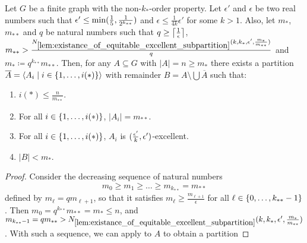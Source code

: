         \begin{lemma}[Claim 5.14.1a] \label{lem:existance_of_excellent_partition_with_equal_size}
            Let $G$ be a finite graph with the non-$k_{*}$-order property.
            Let $\epsilon'$ and $\epsilon$ be two real numbers such that
            $\epsilon' \leq \min ( \frac{1}{5}, \frac{1}{2^{k_{**}}} )$ and $\epsilon \leq \frac{1}{4k} \epsilon'$ for some $k > 1$.
            Also, let $m_*$, $m_{**}$ and $q$ be natural numbers such that $q \geq \left\lceil \frac{1}{\epsilon} \right\rceil$,
            $m_{**} > \frac{N_{\ref{lem:existance_of_equitable_excellent_subpartition}}
                ( k, k_*, \epsilon', \frac{m_*}{m_{**}} )}{q}$ and $m_* \coloneqq q^{k_{**}} m_{**}$.
            Then, for any $A \subseteq G$ with $|A| = n \geq m_*$ there exists a partition
            $\overline{A} = \left< A_i \mid i \in \{ 1, \dots, i(*) \} \right>$ with remainder $B = A \setminus \bigcup \overline{A}$ such that:
            \begin{enumerate}[label=(\alph*), ref=\alph*]
                \item \label{itm:existance_of_excellent_partition_with_equal_size.a} $i(*) \leq \frac{n}{m_{**}}$.
                \item \label{itm:existance_of_excellent_partition_with_equal_size.b} For all
                    $i \in \{ 1, \dots, i(*) \}$, $|A_i| = m_{**}$.
                \item \label{itm:existance_of_excellent_partition_with_equal_size.c} For all
                    $i \in \{ 1, \dots, i(*) \}$, $A_i$ is $( \frac{\epsilon'}{k}, \epsilon' )$-excellent.
                \item \label{itm:existance_of_excellent_partition_with_equal_size.d} $|B| < m_*$.
            \end{enumerate}
            \begin{proof}
                Consider the decreasing sequence of natural numbers
                \[
                    m_0 \geq m_1 \geq \dots \geq m_{k_{**}} = m_{**}
                \]
                defined by $m_\ell = q m_{\ell+1}$, so that it satisfies $m_\ell \geq \frac{m_{\ell+1}}{\epsilon}$ for all
                $\ell \in \{ 0, \dots, k_{**} - 1 \}$.
                Then $m_0 = q^{k_{**}} m_{**} = m_* \leq n$, and $m_{k_{**}-1} = q m_{**} >
                    N_{\ref{lem:existance_of_equitable_excellent_subpartition}}( k, k_*, \epsilon', \frac{m_*}{m_{**}} )$.
                With such a sequence, we can apply  to $A$ to obtain a partition

\end{proof}
\end{lemma}

